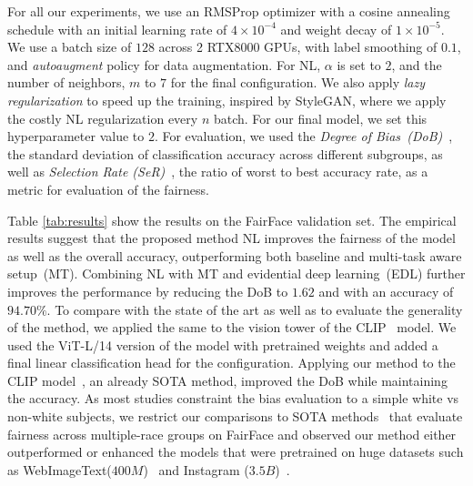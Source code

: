 \documentclass[runningheads]{llncs}
\begin{document}
For all our experiments, we use an RMSProp optimizer with a cosine annealing schedule with an initial learning rate of $4\times 10^{-4}$ and weight decay of $1\times 10^{-5}$. We use a batch size of $128$ across 2 RTX8000 GPUs, with label smoothing of $0.1$, and \emph{autoaugment} policy for data augmentation. For NL, $\alpha$ is set to $2$, and the number of neighbors, $m$ to $7$ for the final configuration. We also apply \emph{lazy regularization} to speed up the training, inspired by StyleGAN, where we apply the costly NL regularization every $n$ batch. For our final model, we set this hyperparameter value to $2$. For evaluation, we used the \emph{Degree of Bias~(DoB)}~\cite{dob}, the standard deviation of classification accuracy across different subgroups, as well as \emph{Selection Rate (SeR)}~\cite{ser}, the ratio of worst to best accuracy rate, as a metric for evaluation of the fairness.

Table \ref{tab:results} show the results on the FairFace validation set. The empirical results suggest that the proposed method NL improves the fairness of the model as well as the overall accuracy, outperforming both baseline and multi-task aware setup~(MT). Combining NL with MT and evidential deep learning~(EDL) further improves the performance by reducing the DoB to $1.62$ and with an accuracy of $94.70\%$. To compare with the state of the art as well as to evaluate the generality of the method, we applied the same to the vision tower of the CLIP~\cite{clip} model. We used the ViT-L/14 version of the model with pretrained weights and added a final linear classification head for the configuration. Applying our method to the CLIP model~\cite{clip}, an already SOTA method, improved the DoB while maintaining the accuracy. As most studies constraint the bias evaluation to a simple white vs non-white subjects, we restrict our comparisons to SOTA methods~\cite{lp_insta,clip} that evaluate fairness across multiple-race groups on FairFace and observed our method either outperformed or enhanced the models that were pretrained on huge datasets such as WebImageText($400M$)~\cite{clip} and Instagram ($3.5B$)~\cite{lp_insta}.
\end{document}
